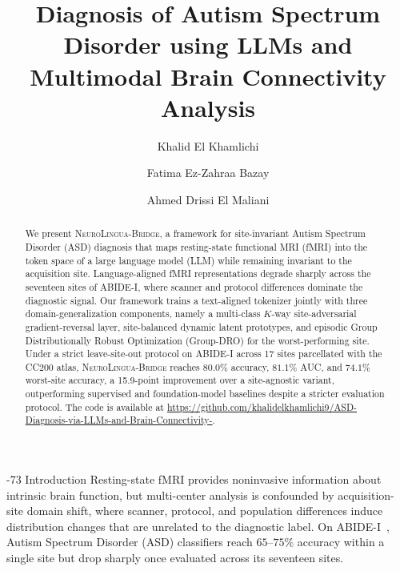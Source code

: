 \documentclass[runningheads]{llncs}
\makeatletter
\renewcommand\section{\@startsection{section}{1}{\z@}%
  {-7\p@ \@plus -1\p@ \@minus -1\p@}{3\p@ \@plus 1\p@ \@minus 1\p@}%
  {\normalfont\large\bfseries\boldmath}}
\newcommand{\method}{\textsc{NeuroLingua-Bridge}}
\makeatother
\begin{document}
\title{Diagnosis of Autism Spectrum Disorder using LLMs and Multimodal Brain Connectivity Analysis}
\author{Khalid El Khamlichi \and Fatima Ez-Zahraa Bazay \and Ahmed Drissi El Maliani}

\maketitle

\begin{abstract}
We present \method{}, a framework for site-invariant Autism Spectrum Disorder (ASD) 
diagnosis that maps resting-state functional MRI (fMRI) into the token space of a large language model (LLM) while remaining invariant to the acquisition site. 
Language-aligned fMRI representations degrade sharply across the seventeen sites 
of ABIDE-I, where scanner and protocol differences dominate the diagnostic signal. 
Our framework trains a text-aligned tokenizer jointly with three domain-generalization 
components, namely a multi-class $K$-way site-adversarial gradient-reversal layer, 
site-balanced dynamic latent prototypes, and episodic Group Distributionally Robust 
Optimization (Group-DRO) for the worst-performing site. Under a strict leave-site-out protocol on ABIDE-I across 17 sites parcellated with the CC200 atlas, \method{} reaches $80.0\%$ accuracy, $81.1\%$ AUC, and $74.1\%$ worst-site accuracy, a 15.9-point improvement over a site-agnostic variant, outperforming supervised and foundation-model baselines despite a stricter evaluation protocol. The code is available 
at \url{https://github.com/khalidelkhamlichi9/ASD-Diagnosis-via-LLMs-and-Brain-Connectivity-}.
\end{abstract}

\section{Introduction}
\label{sec:intro}
Resting-state fMRI provides noninvasive information about intrinsic brain function, 
but multi-center analysis is confounded by acquisition-site domain shift, where scanner, 
protocol, and population differences induce distribution changes that are unrelated to 
the diagnostic label. On ABIDE-I~\cite{dimartino2014abide}, Autism Spectrum Disorder 
(ASD) classifiers reach $65$--$75\%$ accuracy within a single site but drop sharply once 
evaluated across its seventeen sites.
\end{document}
